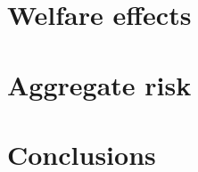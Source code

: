 \documentclass{beamer}
\begin{document}
\section{Welfare effects}
\subsection{}


\section{Aggregate risk}
\subsection{}

\section{Conclusions}
\subsection{}
\end{document}
